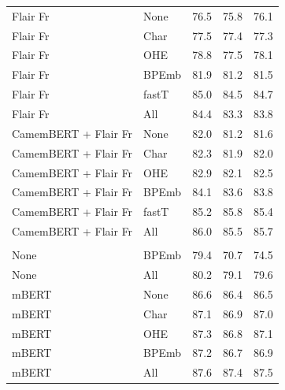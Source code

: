 \documentclass[12pt,a4paper,]{book}
\begin{document}
\begin{longtable}[t]{llrrr}
\hspace{1em}Flair Fr & None & 76.5 & 75.8 & 76.1\\
\hspace{1em}Flair Fr & Char & 77.5 & 77.4 & 77.3\\
\hspace{1em}Flair Fr & OHE & 78.8 & 77.5 & 78.1\\
\hspace{1em}Flair Fr & BPEmb & 81.9 & 81.2 & 81.5\\
\hspace{1em}Flair Fr & fastT & 85.0 & 84.5 & 84.7\\
\hspace{1em}Flair Fr & All & 84.4 & 83.3 & 83.8\\
\hspace{1em}CamemBERT + Flair Fr & None & 82.0 & 81.2 & 81.6\\
\hspace{1em}CamemBERT + Flair Fr & Char & 82.3 & 81.9 & 82.0\\
\hspace{1em}CamemBERT + Flair Fr & OHE & 82.9 & 82.1 & 82.5\\
\hspace{1em}CamemBERT + Flair Fr & BPEmb & 84.1 & 83.6 & 83.8\\
\hspace{1em}CamemBERT + Flair Fr & fastT & 85.2 & 85.8 & 85.4\\
\hspace{1em}CamemBERT + Flair Fr & All & 86.0 & 85.5 & 85.7\\
\addlinespace[0.3em]
\multicolumn{5}{l}{\textbf{Multilingual embeddings}}\\
\hspace{1em}None & BPEmb & 79.4 & 70.7 & 74.5\\
\hspace{1em}None & All & 80.2 & 79.1 & 79.6\\
\hspace{1em}mBERT & None & 86.6 & 86.4 & 86.5\\
\hspace{1em}mBERT & Char & 87.1 & 86.9 & 87.0\\
\hspace{1em}mBERT & OHE & 87.3 & 86.8 & 87.1\\
\hspace{1em}mBERT & BPEmb & 87.2 & 86.7 & 86.9\\
\hspace{1em}mBERT & All & 87.6 & 87.4 & 87.5\\

\end{longtable}
\end{document}
